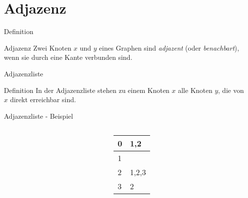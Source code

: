 \section{Adjazenz}
\begin{frame}{Definition}
    \begin{block}{Adjazenz}
        Zwei Knoten $x$ und $y$ eines Graphen sind \emph{adjazent} (oder \emph{benachbart}), wenn sie durch eine Kante verbunden sind.
    \end{block}
\end{frame}
\begin{frame}{Adjazenzliste}
    \begin{block}{Definition}
        In der Adjazenzliste stehen zu einem Knoten $x$ alle Knoten $y$, die von $x$ direkt erreichbar sind.
    \end{block}
\end{frame}
\begin{frame}{Adjazenzliste - Beispiel}
    \begin{columns}
        \begin{column}{.5\textwidth}
            \centering
        \end{column}
        \begin{column}{.5\textwidth}
            \begin{table}
                \begin{tabular}{|l|l|}
                    \hline
                    0 & 1,2\\\hline
                    1 & \\\hline
                    2 & 1,2,3\\\hline
                    3 & 2\\\hline
                \end{tabular}
            \end{table}
        \end{column}
    \end{columns}
\end{frame}
